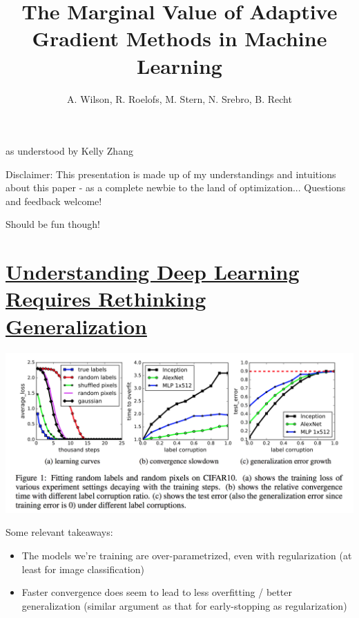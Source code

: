 \documentclass[12pt]{article}
\title{The Marginal Value of Adaptive Gradient Methods in Machine Learning}
\author{A. Wilson, R. Roelofs, M. Stern, N. Srebro, B. Recht}
\begin{document}
\maketitle
as understood by Kelly Zhang

\vspace{3mm}
Disclaimer: This presentation is made up of my understandings and intuitions about this paper - as a complete newbie to the land of optimization... Questions and feedback welcome!

Should be fun though!

\section{ \href{https://arxiv.org/pdf/1611.03530.pdf}{Understanding Deep Learning Requires Rethinking Generalization} }
\includegraphics[width=1\textwidth]{rethinking}

\vspace{3mm}

Some relevant takeaways:
\begin{itemize}
	\item The models we're training are over-parametrized, even with regularization (at least for image classification)
	\item Faster convergence does seem to lead to less overfitting / better generalization (similar argument as that for early-stopping as regularization)
\end{itemize}

\newpage
\end{document}
